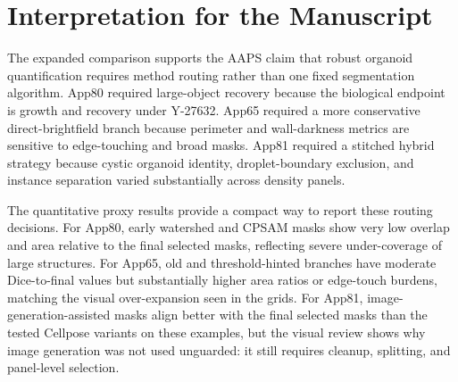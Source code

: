 \documentclass[11pt]{article}
\begin{document}
\section*{Interpretation for the Manuscript}

The expanded comparison supports the AAPS claim that robust organoid
quantification requires method routing rather than one fixed segmentation
algorithm. App80 required large-object recovery because the biological endpoint
is growth and recovery under Y-27632. App65 required a more conservative
direct-brightfield branch because perimeter and wall-darkness metrics are
sensitive to edge-touching and broad masks. App81 required a stitched hybrid
strategy because cystic organoid identity, droplet-boundary exclusion, and
instance separation varied substantially across density panels.

The quantitative proxy results provide a compact way to report these routing
decisions. For App80, early watershed and CPSAM masks show very low overlap and
area relative to the final selected masks, reflecting severe under-coverage of
large structures. For App65, old and threshold-hinted branches have moderate
Dice-to-final values but substantially higher area ratios or edge-touch burdens,
matching the visual over-expansion seen in the grids. For App81,
image-generation-assisted masks align better with the final selected masks than
the tested Cellpose variants on these examples, but the visual review shows why
image generation was not used unguarded: it still requires cleanup, splitting,
and panel-level selection.
\end{document}
